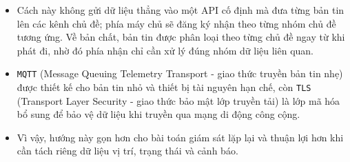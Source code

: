 \documentclass[a4paper]{extarticle}
\providecommand{\tightlist}{%
  \setlength{\itemsep}{0pt}\setlength{\parskip}{0pt}}
\begin{document}
\begin{itemize}
  \begin{itemize}
  \tightlist
  \item
    Cách này không gửi dữ liệu thẳng vào một API cố định mà đưa từng bản tin lên các kênh chủ đề; phía máy chủ sẽ đăng ký nhận theo từng nhóm chủ đề tương ứng. Về bản chất, bản tin được phân loại theo từng chủ đề ngay từ khi phát đi, nhờ đó phía nhận chỉ cần xử lý đúng nhóm dữ liệu liên quan.
  \item
    \texttt{MQTT} (Message Queuing Telemetry Transport - giao thức truyền bản tin nhẹ) được thiết kế cho bản tin nhỏ và thiết bị tài nguyên hạn chế, còn \texttt{TLS} (Transport Layer Security - giao thức bảo mật lớp truyền tải) là lớp mã hóa bổ sung để bảo vệ dữ liệu khi truyền qua mạng di động công cộng.
  \item
    Vì vậy, hướng này gọn hơn cho bài toán giám sát lặp lại và thuận lợi hơn khi cần tách riêng dữ liệu vị trí, trạng thái và cảnh báo.
  \end{itemize}
\end{itemize}
\end{document}
